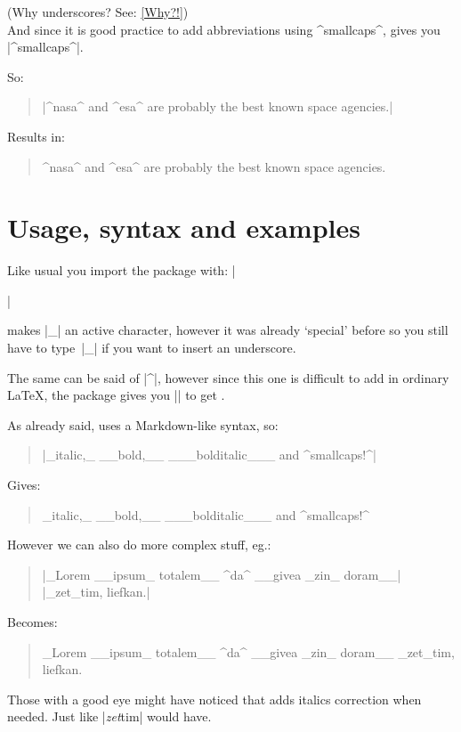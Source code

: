\documentclass[11pt, cm-default]{l3doc}
\begin{document}
	(Why underscores? See: \ref{Why?!})\\
	
	And since it is good practice to add abbreviations using ^smallcaps^,  gives you |^smallcaps^|.
	
	So:
	\begin{quote}
		|^nasa^ and ^esa^ are probably the best known space agencies.|
	\end{quote}

	Results in:
	\begin{quote}
		^nasa^ and ^esa^ are probably the best known space agencies.
	\end{quote}
	
	\section{Usage, syntax and examples}
	Like usual you import the package with: |\usepackage{easyformat}|

	 makes |_| an active character, however it was already `special' before so you still have to type~|\_| if you want to insert an underscore.
	
	The same can be said of |^|, however since this one is difficult to add in ordinary \LaTeX, the  package gives you |\cir| to get \cir.
	
	\newpage

	As already said,  uses a Markdown-like syntax, so:
	
	\begin{quote}
		|_italic,_ __bold,__ ___bolditalic___ and ^smallcaps!^|
	\end{quote}

	Gives:
	\begin{quote}
		_italic,_ __bold,__ ___bolditalic___ and ^smallcaps!^
	\end{quote}

	However we can also do more complex stuff, eg.:
	\begin{quote}
		|_Lorem __ipsum_ totalem__ ^da^ __givea _zin_ doram__|\\
		|_zet_tim, liefkan.|
	\end{quote}
	
	Becomes:
	\begin{quote}
		_Lorem __ipsum_ totalem__ ^da^ __givea _zin_ doram__ _zet_tim, liefkan.
	\end{quote}

	Those with a good eye might have noticed that  adds italics correction when needed. Just like |\textit{zet}tim| would have.
	
\end{document}
